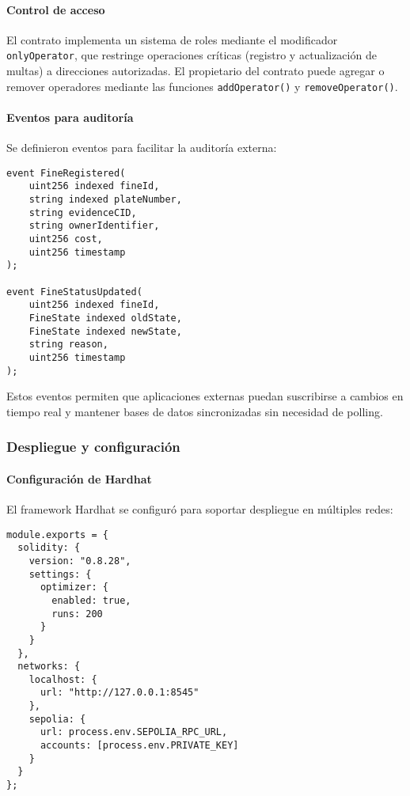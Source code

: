 \paragraph{Control de acceso}
El contrato implementa un sistema de roles mediante el modificador \texttt{onlyOperator}, que restringe operaciones críticas (registro y actualización de multas) a direcciones autorizadas. El propietario del contrato puede agregar o remover operadores mediante las funciones \texttt{addOperator()} y \texttt{removeOperator()}.

\paragraph{Eventos para auditoría}
Se definieron eventos para facilitar la auditoría externa:

\begin{verbatim}
event FineRegistered(
    uint256 indexed fineId,
    string indexed plateNumber,
    string evidenceCID,
    string ownerIdentifier,
    uint256 cost,
    uint256 timestamp
);

event FineStatusUpdated(
    uint256 indexed fineId,
    FineState indexed oldState,
    FineState indexed newState,
    string reason,
    uint256 timestamp
);
\end{verbatim}

Estos eventos permiten que aplicaciones externas puedan suscribirse a cambios en tiempo real y mantener bases de datos sincronizadas sin necesidad de polling.

\subsubsection{Despliegue y configuración}

\paragraph{Configuración de Hardhat}
El framework Hardhat se configuró para soportar despliegue en múltiples redes:

\begin{verbatim}
module.exports = {
  solidity: {
    version: "0.8.28",
    settings: {
      optimizer: {
        enabled: true,
        runs: 200
      }
    }
  },
  networks: {
    localhost: {
      url: "http://127.0.0.1:8545"
    },
    sepolia: {
      url: process.env.SEPOLIA_RPC_URL,
      accounts: [process.env.PRIVATE_KEY]
    }
  }
};
\end{verbatim}

